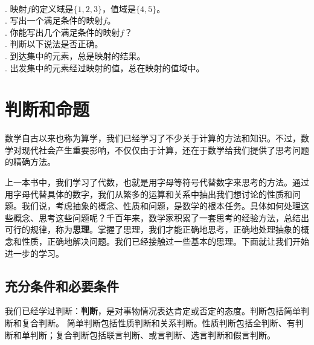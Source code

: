 \begin{xt}\label{xt:2-2-0}
    \mbox{} \\
    . 映射$f$的定义域是$\{1,2,3\}$，值域是$\{4,5\}$。\\
    . 写出一个满足条件的映射$f$。\\
    . 你能写出几个满足条件的映射$f$？\\
    . 判断以下说法是否正确。\\
    . 到达集中的元素，总是映射的结果。\\
    . 出发集中的元素经过映射的值，总在映射的值域中。%
\end{xt}

\chapter{判断和命题}  %

数学自古以来也称为算学，我们已经学习了不少关于计算的方法和知识。不过，数学对现代社会产生重要影响，不仅仅由于计算，还在于数学给我们提供了思考问题的精确方法。

上一本书中，我们学习了代数，也就是用字母等符号代替数字来思考的方法。通过用字母代替具体的数字，我们从繁多的运算和关系中抽出我们想讨论的性质和问题。我们说，考虑抽象的概念、性质和问题，是数学的根本任务。具体如何处理这些概念、思考这些问题呢？千百年来，数学家积累了一套思考的经验方法，总结出可行的规律，称为\textbf{思理}。掌握了思理，我们才能正确地思考，正确地处理抽象的概念和性质，正确地解决问题。我们已经接触过一些基本的思理。下面就让我们开始进一步的学习。

\section{充分条件和必要条件}
我们已经学过判断：\textbf{判断}，是对事物情况表达肯定或否定的态度。判断包括简单判断和复合判断。
简单判断包括性质判断和关系判断。性质判断包括全判断、有判断和单判断；复合判断包括联言判断、或言判断、选言判断和假言判断。

